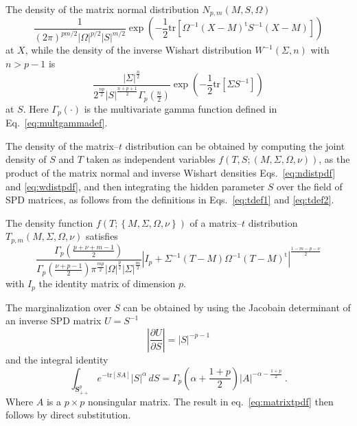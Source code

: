\documentclass[english,listof=totoc]{scrartcl}
\begin{document}
The density of the matrix normal distribution $N_{p,m}(M,S,\Omega)$
\begin{equation}
\frac{1}{(2\pi)^{pm/2}|\Omega|^{p/2}|S|^{m/2}}%
\exp\left(-\frac{1}{2}\textrm{tr}\left[\Omega^{-1}(X-M)^{\textrm{t}}S^{-1}(X-M)\right]\right)
\label{eq:ndistpdf}
\end{equation}
at $X$,  while the density of the inverse Wishart distribution
$W^{-1}(\Sigma,n)$ with $n>p-1$ is
\begin{equation}
\frac{|\Sigma|^{\frac{n}{2}}}{2^{\frac{n p}{2}}%
|S|^{\frac{n+p+1}{2}}\Gamma_{p}(\frac{n}{2})}%
\exp\left(-\frac{1}{2}\textrm{tr}\left[\Sigma S^{-1}\right]\right)
\label{eq:wdistpdf}
\end{equation}
at $S$. Here $\Gamma_{p}(\cdot)$ is the multivariate gamma function
defined in Eq.~\eqref{eq:multgammadef}.

The density of the matrix--$t$ distribution can be obtained by
computing the joint density of $S$ and $T$ taken as independent
variables $f\left(T,S; (M,\Sigma,\Omega,\nu)\right)$, as the product
of the matrix normal and inverse Wishart densities
Eqs.~\eqref{eq:ndistpdf} and \eqref{eq:wdistpdf}, and then integrating
the hidden parameter $S$  over the field of SPD matrices, as follows
from the definitions in Eqs.~\eqref{eq:tdef1} and \eqref{eq:tdef2}.

The density function
$f(T;\left\{M,\Sigma,\Omega,\nu\right\})$ of a matrix--$t$
distribution $T_{p,m}(M,\Sigma,\Omega,\nu)$ satisfies
\begin{equation}
\frac{\Gamma_{p}\left(\frac{p+\nu+m-1}{2}\right)}%
{\Gamma_{p}\left(\frac{\nu+p-1}{2}\right)%
\pi^{\frac{mp}{2}}|\Omega|^{\frac{p}{2}}|\Sigma|^{\frac{m}{2}}}%
|I_p+\Sigma^{-1}(T-M)\Omega^{-1}(T-M)^{\textrm{t}}|^{\frac{1-m-p-\nu}{2}}
\label{eq:matrixtpdf}
\end{equation}
%
with $I_p$ the identity matrix of dimension $p$.

The marginalization
over $S$ can be obtained by using the Jacobain determinant of an
inverse SPD matrix $U=S^{-1}$
%
\begin{equation}
\left|\frac{\partial U}{\partial S}\right|=|S|^{-p-1}
\end{equation}
and the integral identity \citep{gupta1999matrix}
\begin{equation}
\int_{\mathbf{S}_{++}^p}e^{-\textrm{tr}[S A]}|S|^{\alpha}\,dS=%
\Gamma_{p}\left(\alpha+\frac{1+p}{2}\right)|A|^{-\alpha-\frac{1+p}{2}}
\ .\label{eq:intmultgammadef}
\end{equation}
Where $A$ is a $p\times p$ nonsingular matrix. The result in
eq.~\eqref{eq:matrixtpdf} then follows by direct substitution.
\end{document}
